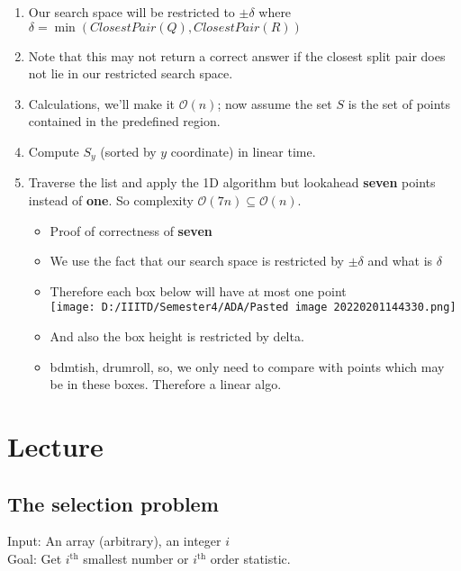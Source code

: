 \documentclass[a4paper
]{article}
\providecommand{\tightlist}{%
  \setlength{\itemsep}{0pt}\setlength{\parskip}{0pt}}
\begin{document}
\begin{enumerate}
\tightlist
\item
  Our search space will be restricted to {\(\pm \delta\)} where\\
  {\(\delta = \min({ClosestPair}(Q),{ClosestPair}(R))\)}
\item
  Note that this may not return a correct answer if the closest split
  pair does not lie in our restricted search space.
\item
  Calculations, we'll make it {\(\mathcal{O}(n)\)}; now assume the set
  {\(S\)} is the set of points contained in the predefined region.
\item
  Compute {\(S_{y}\)} (sorted by {\(y\)} coordinate) in linear time.
\item
  Traverse the list and apply the 1D algorithm but lookahead
  \textbf{seven} points instead of \textbf{one}. So complexity
  {\(\mathcal{O}(7n) \subseteq \mathcal{O}(n)\)}.

  \begin{itemize}
  \tightlist
  \item
    Proof of correctness of \textbf{seven}
  \item
    We use the fact that our search space is restricted by
    {\(\pm \delta\)} and what is {\(\delta\)}
  \item
    Therefore each box below will have at most one point\\
    \texttt{[image: D:/IIITD/Semester4/ADA/Pasted image 20220201144330.png]}
  \item
    And also the box height is restricted by delta.
  \item
    bdmtish, drumroll, so, we only need to compare with points which may
    be in these boxes. Therefore a linear algo.
  \end{itemize}
\end{enumerate}

\hypertarget{lecture-5}{%
\section{Lecture}\label{lecture-5}}

\hypertarget{the-selection-problem}{%
\subsection{The selection problem}\label{the-selection-problem}}

Input: An array (arbitrary), an integer {\(i\)}\\
Goal: Get {\(i^{\text{th}}\)} smallest number or {\(i^{\text{th}}\)}
order statistic.
\end{document}
